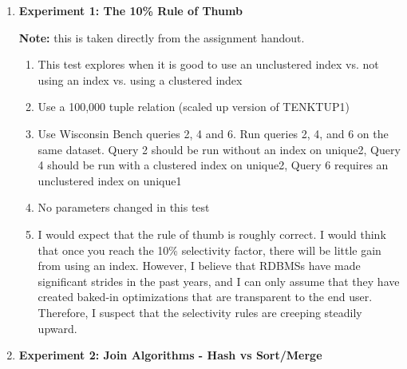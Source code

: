 \documentclass[11pt,letterpaper]{article}
\begin{document}
\begin{enumerate}
\begin{enumerate}
	\item \textbf{Experiment 1: The 10\% Rule of Thumb}
	
	\textbf{Note:} this is taken directly from the assignment handout.
	
	\begin{enumerate}
		
		\item This test explores when it is good to use an unclustered index vs. not using an index vs. using a clustered index
		\item Use a 100,000 tuple relation (scaled up version of TENKTUP1)
		\item Use Wisconsin Bench queries 2, 4 and 6. Run queries 2, 4, and 6 on the same dataset. Query 2 should be run without an index on unique2, Query 4 should be run with a clustered index on unique2, Query 6 requires an unclustered index on unique1
		\item No parameters changed in this test
		\item I would expect that the rule of thumb is roughly correct.  I would think that once you reach the 10\% selectivity factor, there will be little gain from using an index.  However, I believe that RDBMSs have made significant strides in the past years, and I can only assume that they have created baked-in optimizations that are transparent to the end user.  Therefore, I suspect that the selectivity rules are creeping steadily upward.
		
	\end{enumerate}
	 
	\item \textbf{Experiment 2: Join Algorithms - Hash vs Sort/Merge}
	
	\begin{enumerate}
		

\end{enumerate}
\end{enumerate}
\end{enumerate}
\end{document}
